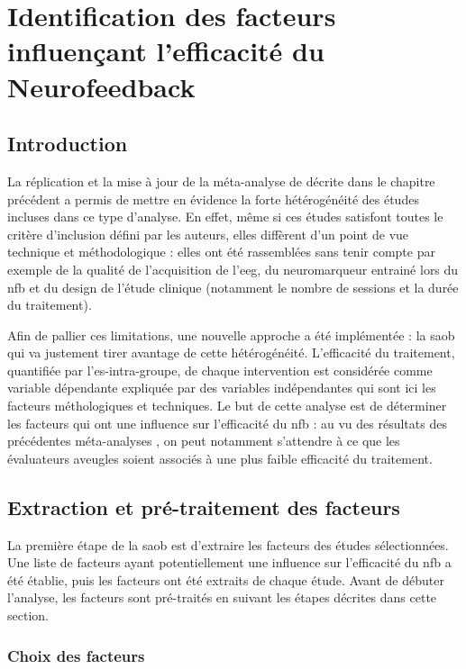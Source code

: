 \chapter{Identification des facteurs influençant l'efficacité du Neurofeedback}

\section*{Introduction}

La réplication et la mise à jour de la méta-analyse de \citet{Cortese2016} décrite dans le chapitre précédent a permis de mettre en évidence la forte hétérogénéité des études incluses dans ce type d'analyse. 
En effet, même si ces études satisfont toutes le critère d'inclusion défini par les auteurs, elles diffèrent d'un point de vue technique et méthodologique : elles ont été rassemblées 
sans tenir compte par exemple de la qualité de l'acquisition de l'\gls{eeg}, du neuromarqueur entrainé lors du \gls{nfb} et du design de l'étude clinique (notamment le nombre de 
sessions et la durée du traitement). 

Afin de pallier ces limitations, une nouvelle approche a été implémentée : la \gls{saob} qui va justement tirer avantage de cette hétérogénéité. L'efficacité du traitement, quantifiée 
par l'\gls{es}-intra-groupe, de chaque intervention est considérée comme variable dépendante expliquée par des variables indépendantes qui sont ici les facteurs méthologiques et techniques. 
Le but de cette analyse est de déterminer les facteurs qui ont une influence sur l'efficacité du \gls{nfb} : au vu des résultats des précédentes méta-analyses \citep{Micoulaud2014, Cortese2016}, 
on peut notamment s'attendre à ce que les évaluateurs aveugles soient associés à une plus faible efficacité du traitement. 

\section{Extraction et pré-traitement des facteurs}

La première étape de la \gls{saob} est d'extraire les facteurs des études sélectionnées. Une liste de facteurs ayant potentiellement une influence sur l'efficacité du \gls{nfb} a été 
établie, puis les facteurs ont été extraits de chaque étude. Avant de débuter l'analyse, les facteurs sont pré-traités en suivant les étapes décrites dans cette section. 

\subsection{Choix des facteurs}

